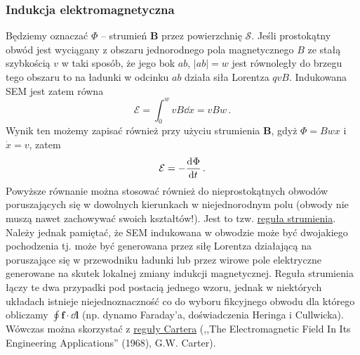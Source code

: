 \documentclass[../main.tex]{subfiles}
\begin{document}
    \subsubsection{Indukcja elektromagnetyczna}
    Będziemy oznaczać \(\Phi\) -- strumień \(\mathbf{B}\) przez powierzchnię \(\mathcal{S}\). Jeśli
    prostokątny obwód jest wyciągany z obszaru jednorodnego pola magnetycznego \(B\) ze stałą
    szybkością \(v\) w taki sposób, że jego bok \(ab\), \(|ab|=w\) jest równoległy do brzegu tego
    obszaru to na ładunki w odcinku \(ab\) działa siła Lorentza \(qvB\). Indukowana SEM jest zatem
    równa
    \begin{equation*}
        \mathcal{E}=\int_0^wvB\dd{x}=vBw\,.
    \end{equation*}
    Wynik ten możemy zapisać również przy użyciu strumienia \(\mathbf{B}\), gdyż \(\Phi=Bwx\) i
    \(\dot x=v\), zatem
    \begin{equation*}
        \mathcal{E}=-\dv[]{\Phi}{t}\,.
    \end{equation*}
    Powyższe równanie można stosować również do nieprostokątnych obwodów poruszających się w
    dowolnych kierunkach w niejednorodnym polu (obwody nie muszą nawet zachowywać swoich
    kształtów!). Jest to tzw. \underline{reguła strumienia}. Należy jednak pamiętać, że SEM
    indukowana w obwodzie może być dwojakiego pochodzenia tj. może być generowana przez siłę
    Lorentza działającą na poruszające się w przewodniku ładunki lub przez wirowe pole elektryczne
    generowane na skutek lokalnej zmiany indukcji magnetycznej. Reguła strumienia łączy te dwa
    przypadki pod postacią jednego wzoru, jednak w niektórych układach istnieje niejednoznaczność co
    do wyboru fikcyjnego obwodu dla którego obliczamy \(\oint\mathbf{f}\cdot\dd{\mathbf{l}}\) (np.
    dynamo Faraday'a, doświadczenia Heringa i Cullwicka). Wówczas można skorzystać z
    \underline{reguły Cartera} (,,The Electromagnetic Field In Its Engineering Applications''
    (1968), G.W. Carter).
    \medskip
    
        \noindent{}
\end{document}
